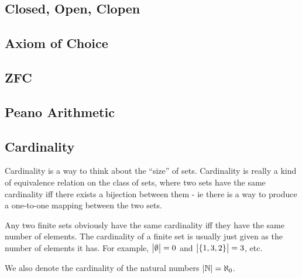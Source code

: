 \subsection{Closed, Open, Clopen}

\subsection{Axiom of Choice}

\subsection{ZFC}

\subsection{Peano Arithmetic}

\subsection{Cardinality}


Cardinality is a way to think about the ``size'' of sets. Cardinality is
really a kind of equivalence relation on the class of sets, where two sets
have the same cardinality iff there exists a bijection between them - ie
there is a way to produce a one-to-one mapping between the two sets.

Any two finite sets obviously have the same cardinality iff they have the
same number of elements. The cardinality of a finite set is usually just
given as the number of elements it has. For example, \(\abs{\emptyset} = 0\)
and \(\abs{\set{1, 3, 2}} = 3\), etc.

We also denote the cardinality of the natural numbers
\(\abs{\mathbb N} = \aleph_0\).
